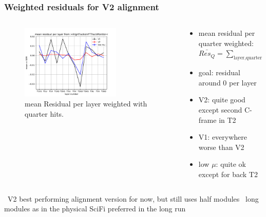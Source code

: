 \documentclass[aspectratio=1610, 12pt]{beamer}
\begin{document}
\begin{frame}\frametitle{Weighted residuals for V2 alignment}
    \begin{columns}
      \begin{column}[c]{0.48\textwidth}
        \begin{figure}
          \centering
          \includegraphics[width=0.7\textwidth]{2023-mar-9-DPG/meanResidual_AlignTracks_weighted.pdf}
          \caption{mean Residual per layer weighted with quarter hits.}
        \end{figure}
      \end{column}
      \begin{column}{0.48\textwidth}
        \begin{itemize}
          \item mean residual per quarter weighted: $
              \bar{Res_{Q}} = \sum_{\text{layer}, \text{quarter}} \frac{\text{hits quarter of layer}}{\text{hits layer}}$
          \item goal: residual around 0 per layer
          \item V2: quite good except second C-frame in T2
          \item V1: everywhere worse than V2
          \item low $\mu$: quite ok except for back T2
        \end{itemize}
      \end{column}
    \end{columns}
  \to\, V2 best performing alignment version for now, but still uses half modules
  \to\, long modules as in the physical SciFi preferred in the long run
\end{frame}
\end{document}

